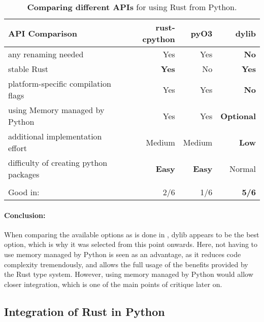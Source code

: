 \begin{table}[ht]
\begin{tabular}{@{}lrrr@{}}
    \textbf{API Comparison} & rust-cpython & pyO3 & dylib \\
    \midrule
    any renaming needed             & Yes    & Yes & \textbf{No} \\
    stable Rust                     & \textbf{Yes}    & No  & \textbf{Yes} \\
    platform-specific compilation flags & Yes & Yes & \textbf{No} \\
    using Memory managed by Python  & Yes    & Yes & \textbf{Optional} \\
    additional implementation effort                 & Medium & Medium & \textbf{Low} \\
    difficulty of creating python packages        & \textbf{Easy}\footnotemark  & \textbf{Easy}\footnotemark[\value{footnote}] & Normal \\ \\
    \midrule
    Good in: & 2/6 & 1/6 & \textbf{5/6} \\
\end{tabular}
    \caption[Comparison of different interfaces between Rust and Python]
    {\textbf{Comparing different APIs} for using Rust from Python.}
    \label{tab:interfaces}
\end{table}


\paragraph{Conclusion:} When comparing the available options as is done in
, dylib appears to be the best option, which is why it
was selected from this point onwards. Here, not having to use memory managed by
Python is seen as an advantage, as it reduces code complexity tremendously, and
allows the full usage of the benefits provided by the Rust type system.
However, using memory managed by Python would allow closer integration, which
is one of the main points of critique later on.


\subsection{Integration of Rust in Python}\label{sec:integration}


